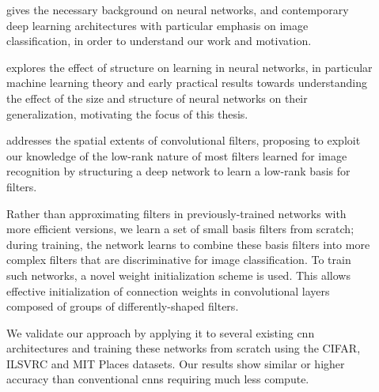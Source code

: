 \documentclass[thesis]{subfiles}
\begin{document}
\begin{description}
	\item[] gives the necessary background on neural networks, and contemporary deep learning architectures
	with particular emphasis on image classification, in order to understand our work and motivation.
	
	\item[] explores the effect of structure on learning in neural networks, in particular machine learning theory and early practical results towards understanding the effect of the size and structure of neural networks on their generalization, motivating the focus of this thesis.
	
	\item[] addresses the spatial extents of convolutional filters, proposing to exploit our knowledge of the low-rank nature of most filters learned for image recognition by structuring a deep network to learn a low-rank basis for filters.
	
	Rather than approximating filters in previously-trained networks with more efficient versions, we learn a set of small basis filters from scratch; during training, the network learns to combine these basis filters into more complex filters that are discriminative for image classification. To train such networks, a novel weight initialization scheme is used. This allows effective initialization of connection weights in convolutional layers composed of groups of differently-shaped filters. 
	
	We validate our approach by applying it to several existing \gls{cnn} architectures and training these networks from scratch using the CIFAR, ILSVRC and MIT Places datasets. Our results show similar or higher accuracy than conventional \glspl{cnn} requiring much less compute. %
	

\end{description}
\end{document}

